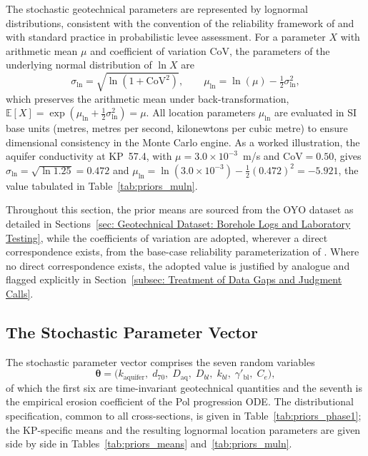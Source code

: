 The stochastic geotechnical parameters are represented by lognormal distributions, consistent with the convention of the reliability framework of \textcite{pol_sie_2024} and with standard practice in probabilistic levee assessment. For a parameter $X$ with arithmetic mean $\mu$ and coefficient of variation $\mathrm{CoV}$, the parameters of the underlying normal distribution of $\ln X$ are
\begin{equation}
\sigma_{\ln} = \sqrt{\ln\!\left(1 + \mathrm{CoV}^2\right)},
\qquad
\mu_{\ln} = \ln(\mu) - \tfrac{1}{2}\sigma_{\ln}^2,
\end{equation}
which preserves the arithmetic mean under back-transformation, $\mathbb{E}[X] = \exp(\mu_{\ln} + \tfrac{1}{2}\sigma_{\ln}^2) = \mu$. All location parameters $\mu_{\ln}$ are evaluated in SI base units (metres, metres per second, kilonewtons per cubic metre) to ensure dimensional consistency in the Monte Carlo engine. As a worked illustration, the aquifer conductivity at KP~57.4, with $\mu = 3.0\times10^{-3}$~m/s and $\mathrm{CoV} = 0.50$, gives $\sigma_{\ln} = \sqrt{\ln 1.25} = 0.472$ and $\mu_{\ln} = \ln(3.0\times10^{-3}) - \tfrac{1}{2}(0.472)^2 = -5.921$, the value tabulated in Table~\ref{tab:priors_muln}.

Throughout this section, the prior means are sourced from the OYO dataset as detailed in Sections~\ref{sec: Geotechnical Dataset: Borehole Logs and Laboratory Testing}, while the coefficients of variation are adopted, wherever a direct correspondence exists, from the base-case reliability parameterization of \textcite{pol_sie_2024}. Where no direct correspondence exists, the adopted value is justified by analogue and flagged explicitly in Section~\ref{subsec: Treatment of Data Gaps and Judgment Calls}.

\subsection{The Stochastic Parameter Vector}
\label{subsec: Stochastic Parameter Vector}

The stochastic parameter vector comprises the seven random variables
\begin{equation}
\boldsymbol{\theta} =
\bigl(k_\mathrm{aquifer},\; d_{70},\; D_\mathrm{aq},\; D_{bl},\;
      k_{bl},\; \gamma'_\mathrm{bl},\; C_e\bigr),
\end{equation}
of which the first six are time-invariant geotechnical quantities and the seventh is the empirical erosion coefficient of the Pol progression ODE. The distributional specification, common to all cross-sections, is given in Table~\ref{tab:priors_phase1}; the KP-specific means and the resulting lognormal location parameters are given side by side in Tables~\ref{tab:priors_means} and~\ref{tab:priors_muln}.

